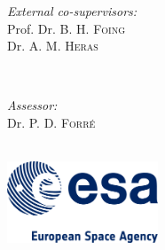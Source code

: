 \begin{titlepage}
\begin{minipage}[t]{0.4\textwidth}
\begin{flushright}
\vspace{-3pt}\emph{External co-supervisors:} \\

Prof. Dr. B. H. \textsc{Foing}\\
Dr. A. M. \textsc{Heras}\\

\end{flushright}

\end{minipage}

~

\begin{minipage}[t]{0.4\textwidth}

\begin{flushleft} \large

\vspace{-3pt}\emph{Assessor:} \\

Dr. P. D. \textsc{Forr\'{e}}\\

\end{flushleft}

\end{minipage}\\[2cm]









\includegraphics[width=4.5cm]{Titlepage/ESA-logo/esa-logo.png}\\ %


 




\vfill %



\end{titlepage}
